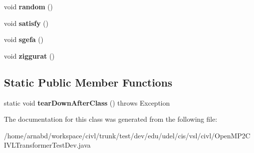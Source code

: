 \begin{DoxyCompactItemize}
\item 
\hypertarget{classedu_1_1udel_1_1cis_1_1vsl_1_1civl_1_1OpenMP2CIVLTransformerTestDev_aa69179a5d688206bb44297c8af8f4161}{}void {\bfseries random} ()\label{classedu_1_1udel_1_1cis_1_1vsl_1_1civl_1_1OpenMP2CIVLTransformerTestDev_aa69179a5d688206bb44297c8af8f4161}

\item 
\hypertarget{classedu_1_1udel_1_1cis_1_1vsl_1_1civl_1_1OpenMP2CIVLTransformerTestDev_a76359b99016b6c8de66b042479303f06}{}void {\bfseries satisfy} ()\label{classedu_1_1udel_1_1cis_1_1vsl_1_1civl_1_1OpenMP2CIVLTransformerTestDev_a76359b99016b6c8de66b042479303f06}

\item 
\hypertarget{classedu_1_1udel_1_1cis_1_1vsl_1_1civl_1_1OpenMP2CIVLTransformerTestDev_aedddb001392c7c23a7d40b04b7a61cc2}{}void {\bfseries sgefa} ()\label{classedu_1_1udel_1_1cis_1_1vsl_1_1civl_1_1OpenMP2CIVLTransformerTestDev_aedddb001392c7c23a7d40b04b7a61cc2}

\item 
\hypertarget{classedu_1_1udel_1_1cis_1_1vsl_1_1civl_1_1OpenMP2CIVLTransformerTestDev_a53e6c32ed2cb6cb5ec9a09bbc58c38b5}{}void {\bfseries ziggurat} ()\label{classedu_1_1udel_1_1cis_1_1vsl_1_1civl_1_1OpenMP2CIVLTransformerTestDev_a53e6c32ed2cb6cb5ec9a09bbc58c38b5}

\end{DoxyCompactItemize}
\subsection*{Static Public Member Functions}
\begin{DoxyCompactItemize}
\item 
\hypertarget{classedu_1_1udel_1_1cis_1_1vsl_1_1civl_1_1OpenMP2CIVLTransformerTestDev_a2a5e210a0a5b9afca292c618ebd654c7}{}static void {\bfseries tear\+Down\+After\+Class} ()  throws Exception \label{classedu_1_1udel_1_1cis_1_1vsl_1_1civl_1_1OpenMP2CIVLTransformerTestDev_a2a5e210a0a5b9afca292c618ebd654c7}

\end{DoxyCompactItemize}


The documentation for this class was generated from the following file\+:\begin{DoxyCompactItemize}
\item 
/home/arnabd/workspace/civl/trunk/test/dev/edu/udel/cis/vsl/civl/Open\+M\+P2\+C\+I\+V\+L\+Transformer\+Test\+Dev.\+java\end{DoxyCompactItemize}
